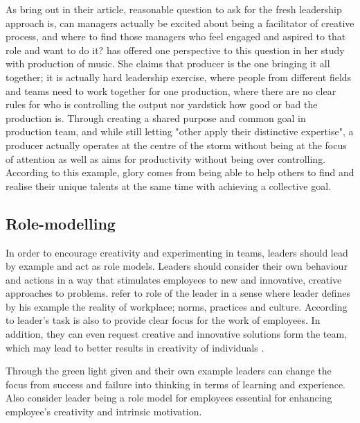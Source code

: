 As \citet{garvin2008yours} bring out in their article, reasonable question to ask for the fresh leadership approach is, can managers actually be excited about being a facilitator of creative process, and where to find those managers who feel engaged and aspired to that role and want to do it? \citet{lingo2010nexus} has offered one perspective to this question in her study with production of music. She claims that producer is the one bringing it all together; it is actually hard leadership exercise, where people from different fields and teams need to work together for one production, where there are no clear rules for who is controlling the output nor yardstick how good or bad the production is. Through creating a shared purpose and common goal in production team, and while still letting "other apply their distinctive expertise", a producer actually operates at the centre of the storm without being at the focus of attention as well as aims for productivity without being over controlling. According to this example, glory comes from being able to help others to find and realise their unique talents at the same time with achieving a collective goal. \citep{lingo2010nexus}

\subsection{Role-modelling}
In order to encourage creativity and experimenting in teams, leaders should lead by example and act as role models. Leaders should consider their own behaviour and actions in a way that stimulates employees to new and innovative, creative approaches to problems. \citep{mumford2002leading,amabile2008creativity,waldman1990adding} \citet{katz1978social} refer to role of the leader in a sense where leader defines by his example the reality of workplace; norms, practices and culture. According to \citet{barczak1989leadership} leader's task is also to provide clear focus for the work of employees. In addition, they can even request creative and innovative solutions form the team, which may lead to better results in creativity of individuals \citep{amabile2002creativity}. 

Through the green light given and their own example leaders can change the focus from success and failure into thinking in terms of learning and experience. \citep{farson2002failuretolerantleader} Also \citet{amabile2004leader} consider leader being a role model for employees essential for enhancing employee's creativity and intrinsic motivation. 

